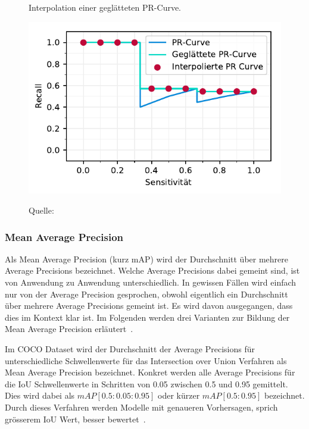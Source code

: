 \begin{figure}[h!]
    \captionsetup{width=.9\linewidth}
    \caption{Interpolation einer geglätteten PR-Curve.}
    \label{fig:pr-interpolated}
    \centering
    \includegraphics[scale=1]{graphics/matplot/ap__pr-interpolated.pdf}\\
    \caption*{Quelle: \textcite{AP}}
\end{figure}

\subsubsection{Mean Average Precision}
\label{chap:map}

Als Mean Average Precision (kurz mAP) wird der Durchschnitt über mehrere Average Precisions bezeichnet. Welche Average Precisions dabei gemeint sind, ist von Anwendung zu Anwendung unterschiedlich. In gewissen Fällen wird einfach nur von der Average Precision gesprochen, obwohl eigentlich ein Durchschnitt über mehrere Average Precisions gemeint ist. Es wird davon ausgegangen, dass dies im Kontext klar ist. Im Folgenden werden drei Varianten zur Bildung der Mean Average Precision erläutert~\autocite{AP}.

Im COCO Dataset wird der Durchschnitt der Average Precisions für unterschiedliche Schwellenwerte für das Intersection over Union Verfahren als Mean Average Precision bezeichnet. Konkret werden alle Average Precisions für die IoU Schwellenwerte in Schritten von 0.05 zwischen 0.5 und 0.95 gemittelt. Dies wird dabei als $mAP[0.5:0.05:0.95]$ oder kürzer $mAP[0.5:0.95]$ bezeichnet. Durch dieses Verfahren werden Modelle mit genaueren Vorhersagen, sprich grösserem IoU Wert, besser bewertet~\autocite{AP}.


